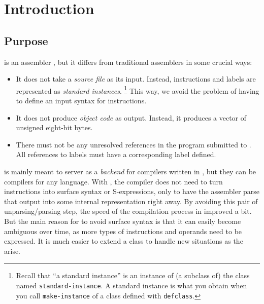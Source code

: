 \chapter{Introduction}
%

\section{Purpose}

\sysname{} is an assembler \cite{Salomon:1992:AL:152201}, but it
differs from traditional assemblers in some crucial ways:

\begin{itemize}
\item It does not take a \emph{source file} as its input.  Instead,
  instructions and labels are represented as \emph{standard
    instances}.%
\footnote{Recall that ``a standard instance'' is an instance of (a
  subclass of) the class named \texttt{standard-instance}.  A standard
  instance is what you obtain when you call \texttt{make-instance} of
  a class defined with \texttt{defclass}.}  This way, we avoid the
problem of having to define an input syntax for instructions.
\item It does not produce \emph{object code} as output.  Instead, it
  produces a \commonlisp{} vector of unsigned eight-bit bytes.
\item There must not be any unresolved references in the program
  submitted to \sysname{}.  All references to labels must have a
  corresponding label defined.
\end{itemize}

\sysname{} is mainly meant to server as a \emph{backend} for
compilers written in \commonlisp{}, but they can be compilers for any
language.  With \sysname{}, the compiler does not need to turn
instructions into surface syntax or S-expressions, only to have the
assembler parse that output into some internal representation right
away.  By avoiding this pair of unparsing/parsing step, the
speed of the compilation process in improved a bit.  But the main
reason for \sysname{} to avoid surface syntax is that it can easily
become ambiguous over time, as more types of instructions and operands
need to be expressed.  It is much easier to extend a \clos{} class to
handle new situations as the arise.

